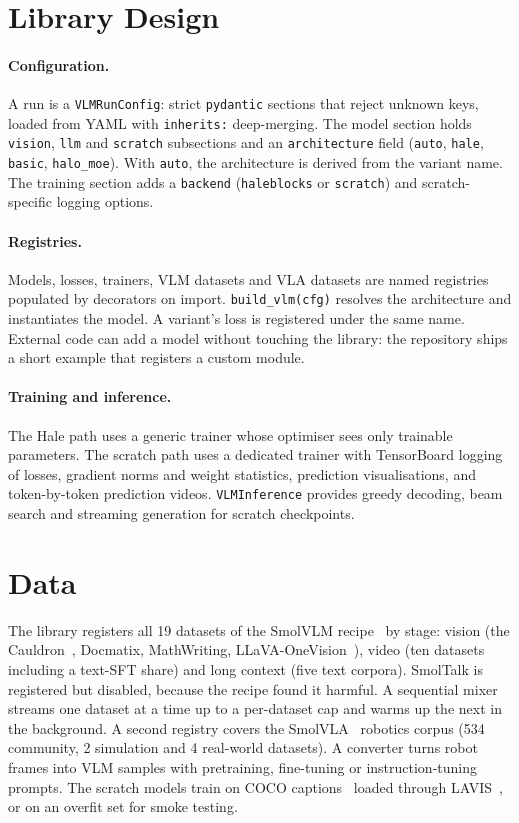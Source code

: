 \documentclass[11pt]{article}
\begin{document}
\section{Library Design}
\label{sec:lib}

\paragraph{Configuration.} A run is a \texttt{VLMRunConfig}: strict \texttt{pydantic} sections that
reject unknown keys, loaded from YAML with \texttt{inherits:} deep-merging. The model section
holds \texttt{vision}, \texttt{llm} and \texttt{scratch} subsections and an \texttt{architecture}
field (\texttt{auto}, \texttt{hale}, \texttt{basic}, \texttt{halo\_moe}). With \texttt{auto}, the
architecture is derived from the variant name. The training section adds a \texttt{backend}
(\texttt{haleblocks} or \texttt{scratch}) and scratch-specific logging options.

\paragraph{Registries.} Models, losses, trainers, VLM datasets and VLA datasets are named
registries populated by decorators on import. \texttt{build\_vlm(cfg)} resolves the
architecture and instantiates the model. A variant's loss is registered under the same
name. External code can add a model without touching the library: the repository ships a
short example that registers a custom module.

\paragraph{Training and inference.} The Hale path uses a generic trainer whose optimiser sees
only trainable parameters. The scratch path uses a dedicated trainer with TensorBoard
logging of losses, gradient norms and weight statistics, prediction visualisations, and
token-by-token prediction videos. \texttt{VLMInference} provides greedy decoding, beam search
and streaming generation for scratch checkpoints.

\section{Data}
\label{sec:data}

The library registers all 19 datasets of the SmolVLM recipe~\cite{marafioti2025smolvlm}
by stage: vision (the Cauldron~\cite{laurencon2024matters}, Docmatix, MathWriting,
LLaVA-OneVision~\cite{li2024llavaonevision}), video (ten datasets including a text-SFT
share) and long context (five text corpora). SmolTalk is registered but disabled, because
the recipe found it harmful. A sequential mixer streams one dataset at a time up to a
per-dataset cap and warms up the next in the background. A second registry covers the
SmolVLA~\cite{shukor2025smolvla} robotics corpus (534 community, 2 simulation and 4
real-world datasets). A converter turns robot frames into VLM samples with
pretraining, fine-tuning or instruction-tuning prompts. The scratch models train on COCO
captions~\cite{lin2014coco} loaded through LAVIS~\cite{li2023lavis}, or on an overfit set for
smoke testing.
\end{document}
